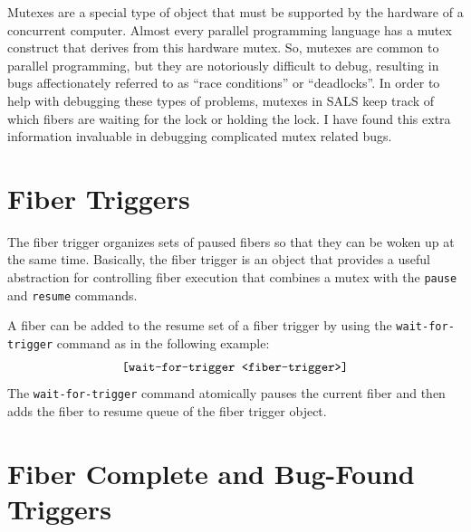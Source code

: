 Mutexes are a special type of object that must be supported by the
hardware of a concurrent computer.  Almost every parallel programming
language has a mutex construct that derives from this hardware mutex.
So, mutexes are common to parallel programming, but they are
notoriously difficult to debug, resulting in bugs affectionately
referred to as ``race conditions'' or ``deadlocks''.  In order to help
with debugging these types of problems, mutexes in SALS keep track of
which fibers are waiting for the lock or holding the lock.  I have
found this extra information invaluable in debugging complicated mutex
related bugs.

\section{Fiber Triggers}

The fiber trigger organizes sets of paused fibers so that they can be
woken up at the same time.  Basically, the fiber trigger is an object
that provides a useful abstraction for controlling fiber execution
that combines a mutex with the {\tt pause} and {\tt resume} commands.

A fiber can be added to the resume set of a fiber trigger by using the
{\tt wait-for-trigger} command as in the following example:
\begin{equation*}
\text{\tt [wait-for-trigger <fiber-trigger>]}
\end{equation*}
The {\tt wait-for-trigger} command atomically pauses the current fiber
and then adds the fiber to resume queue of the fiber trigger object.

\section{Fiber Complete and Bug-Found Triggers}

